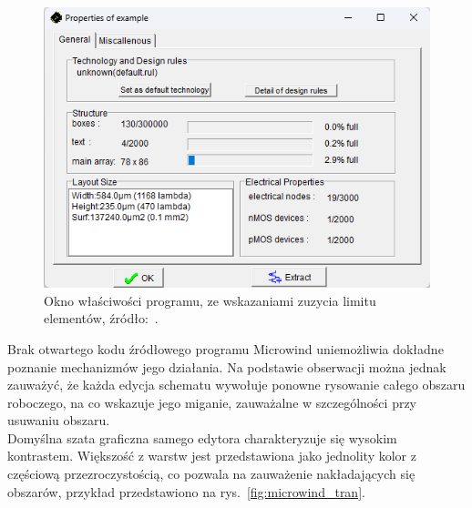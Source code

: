 \begin{figure}[h]
    \centering
    \includegraphics[width=.9\textwidth]{chapters/chapter2/img/microwind_opcje}
    \caption[Okno właściwości programu, ze wskazaniami zuzycia limitu elementów.]
    {
        Okno właściwości programu, ze wskazaniami zuzycia limitu elementów,
        źródło:~\cite{Microwind}.
    }
    \label{fig:microwind_limit}
\end{figure}

Brak otwartego kodu źródłowego programu Microwind uniemożliwia dokładne poznanie mechanizmów jego działania.
Na podstawie obserwacji można jednak zauważyć,
że każda edycja schematu wywołuje ponowne rysowanie całego obszaru roboczego,
na co wskazuje jego miganie, zauważalne w szczególności przy usuwaniu obszaru.\\
\indent Domyślna szata graficzna samego edytora charakteryzuje się wysokim kontrastem.
Większość z warstw jest przedstawiona jako jednolity kolor z częściową przezroczystością,
co pozwala na zauważenie nakładających się obszarów, przykład przedstawiono na rys.~\ref{fig:microwind_tran}.

